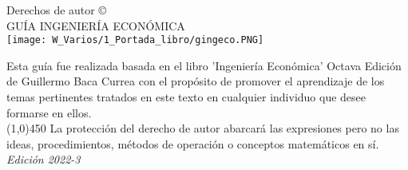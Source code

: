 \documentclass[11pt,fleqn]{book} %
\numberwithin{equation}{section} %
\numberwithin{figure}{section} %
\numberwithin{table}{section} %
\begin{document}

\newpage
\vfill
\thispagestyle{empty}

\noindent Derechos de autor \copyright\\ %

\noindent \textsc{GUÍA INGENIERÍA ECONÓMICA}\\ %

\texttt{[image: W\_Varios/1\_Portada\_libro/gingeco.PNG]}

\vspace{4mm}

\vspace{2mm}
\noindent Esta guía fue realizada basada en el libro 'Ingeniería Económica' Octava Edición de Guillermo Baca Currea con el propósito de promover el aprendizaje de los temas pertinentes tratados en este texto en cualquier individuo que desee formarse en ellos. \\
\line(1,0){450}
\vspace{2mm} La protección del derecho de autor abarcará las expresiones pero no las ideas, procedimientos, métodos de operación o conceptos matemáticos en sí.%
\noindent \textit{Edición 2022-3}

\clearpage

\pagestyle{empty} %
\tableofcontents %
\cleardoublepage %
\pagestyle{fancy} %
\graphicspath{ {img/} }%










%









\end{document}
